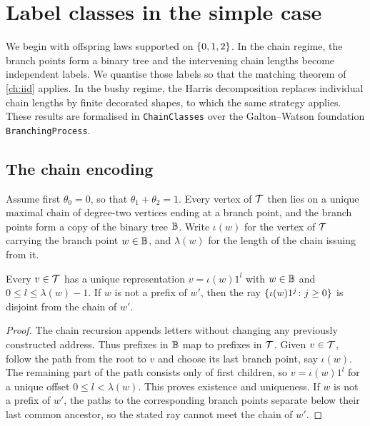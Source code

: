 \chapter{Label classes in the simple case}
\label{ch:chain-simple}

We begin with offspring laws supported on $\{0,1,2\}$. In the chain regime, the branch
points form a binary tree and the intervening chain lengths become independent labels. We
quantise those labels so that the matching theorem of \cref{ch:iid} applies. In the bushy
regime, the Harris decomposition replaces individual chain lengths by finite decorated shapes,
to which the same strategy applies. These results are formalised in \texttt{ChainClasses} over
the Galton--Watson foundation \texttt{BranchingProcess}.

\section{The chain encoding}

Assume first $\theta_0=0$, so that $\theta_1+\theta_2=1$. Every vertex of $\mathcal{T}$ then lies on a
unique maximal chain of degree-two vertices ending at a branch point, and the branch points
form a copy of the binary tree $\mathbb{B}$. Write $\iota(w)$ for the vertex of $\mathcal{T}$ carrying the
branch point $w\in\mathbb{B}$, and $\lambda(w)$ for the length of the chain issuing from it.

\begin{lemma}
\label{thm:chains}
\leanok
{}
Every $v\in\mathcal{T}$ has a unique representation $v=\iota(w)1^{l}$ with $w\in\mathbb{B}$ and
$0\leq l\leq\lambda(w)-1$. If $w$ is not a prefix of $w'$, then the ray
$\{\iota(w)1^{j}\colon j\geq0\}$ is disjoint from the chain of $w'$.
\end{lemma}

\begin{proof}
\leanok
The chain recursion appends letters without changing any previously constructed address. Thus
prefixes in $\mathbb{B}$ map to prefixes in $\mathcal{T}$. Given $v\in\mathcal{T}$, follow the path from the root to
$v$ and choose its last branch point, say $\iota(w)$. The remaining part of the path consists
only of first children, so $v=\iota(w)1^l$ for a unique offset
$0\leq l<\lambda(w)$. This proves existence and uniqueness. If $w$ is not a prefix of $w'$,
the paths to the corresponding branch points separate below their last common ancestor, so the
stated ray cannot meet the chain of $w'$.
\end{proof}

